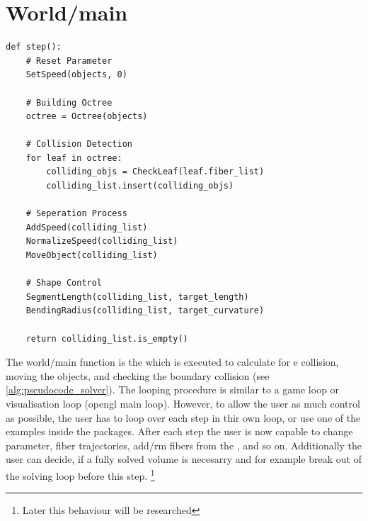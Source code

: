 \section{World/main}
% 
\begin{lstfloat}[!tb]
\lstset{style=python}
\begin{lstlisting}[]
def step():
    # Reset Parameter
    SetSpeed(objects, 0)
    
    # Building Octree
    octree = Octree(objects)
    
    # Collision Detection
    for leaf in octree:
        colliding_objs = CheckLeaf(leaf.fiber_list)
        colliding_list.insert(colliding_objs)
	
    # Seperation Process
    AddSpeed(colliding_list)
    NormalizeSpeed(colliding_list)
    MoveObject(colliding_list)
	
    # Shape Control
    SegmentLength(colliding_list, target_length)
    BendingRadius(colliding_list, target_curvature)

    return colliding_list.is_empty()
\end{lstlisting}
\caption{Pseudocode of the main algorithm: The function \texttt{FiberCollisionSolver} will loop the followings four steps, which are run in parallel, until no collision are detected anymore: 1. build an \texttt{octree} from all objects, 2. \texttt{Collision Detection}, 3. \texttt{Seperation Process} and 4. \texttt{Shape Control}. }
\label{alg:pseudocode_solver}
\end{lstfloat}
% 
The world/main function is the  which is executed to calculate for e collision, moving the objects, and checking the boundary collision (see \cref{alg:pseudocode_solver}).
The looping procedure is similar to a game loop or visualisation loop (\eg opengl main loop).
However, to allow the user as much control as possible, the user has to loop over each step in thir own loop, or use one of the examples inside the packages.
After each step the user is now capable to change parameter, fiber trajectories, add/rm fibers from the , and so on.
Additionally the user can decide, if a fully solved volume is necesarry and for example break out of the solving loop before this step. 
\footnote{Later this behaviour will be researched}
%
